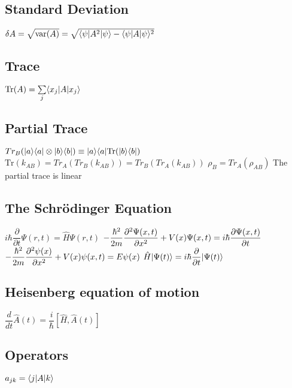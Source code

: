 \subsection{Standard Deviation}
\begin{itemize}
\itemt \( \delta A = \sqrt{\mathrm{var}(A)} = \sqrt{\langle\psi\rvert A^2 \lvert\psi\rangle - \langle\psi\rvert A \lvert\psi\rangle^2} \)
\end{itemize}

\subsection{Trace}
\begin{itemize}
\itemt \( \mathrm{Tr} (A) = \sum\limits_{j} \langle x_j\rvert A \lvert x_j\rangle \)
\end{itemize}

\subsection{Partial Trace}			
\begin{itemize}
\itemt \( Tr_B(\lvert a\rangle\langle a\rvert\otimes\lvert b\rangle\langle b\rvert) \equiv \lvert a\rangle\langle a\rvert \mathrm{Tr} (\lvert b\rangle\langle b\rvert) \)
\itemt \( \mathrm{Tr} (k_{AB}) = Tr_A(Tr_B(k_{AB})) = Tr_B(Tr_A(k_{AB})) \)
\itemt \( \rho_B = Tr_A(\rho_{AB}) \)
\itemt The partial trace is linear
\end{itemize}

\subsection{The Schr\"odinger Equation}			
\begin{itemize}
\itemt \( i \hbar \dfrac{\partial }{\partial t} \Psi (r,t) = \hat{H} \Psi(r,t) \)
\itemt \( -\dfrac{\hbar^2}{2m} \dfrac{\partial ^2 \Psi(x,t)}{\partial x^2} + V(x)\Psi(x,t) = i\hbar\dfrac{\partial \Psi(x,t)}{\partial t} \)
\itemt \( -\dfrac{\hbar^2}{2m} \dfrac{\partial ^2 \psi(x)}{\partial x^2} + V(x)\psi(x,t) = E\psi(x) \)
\itemt \( \hat{H}\lvert\Psi(t)\rangle = i\hbar \dfrac{\partial }{\partial t} \lvert\Psi(t)\rangle \)
\end{itemize}

\subsection{Heisenberg equation of motion}			
\begin{itemize}
\itemt \( \dfrac{d}{dt} \hat{A}(t) = \dfrac{i}{\hbar}[\hat{H},\hat{A}(t)] \)
\end{itemize}			

\subsection{Operators}			
\begin{itemize}
\itemt \( a_{jk} = \langle j\rvert A \lvert k\rangle \)
\end{itemize}			

